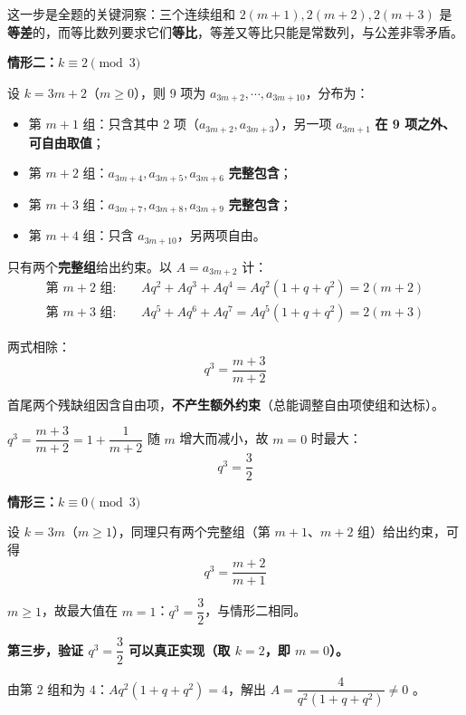 \begin{gktip}
这一步是全题的关键洞察：三个连续组和 $2(m+1),2(m+2),2(m+3)$ 是\textbf{等差}的，而等比数列要求它们\textbf{等比}，等差又等比只能是常数列，与公差非零矛盾。
\end{gktip}

\par\medskip

\textbf{情形二：$k\equiv2\pmod 3$}

设 $k=3m+2$（$m\ge0$），则 9 项为 $a_{3m+2},\cdots,a_{3m+10}$，分布为：
\begin{itemize}
\item 第 $m+1$ 组：只含其中 2 项（$a_{3m+2},a_{3m+3}$），另一项 $a_{3m+1}$ \textbf{在 9 项之外、可自由取值}；
\item 第 $m+2$ 组：$a_{3m+4},a_{3m+5},a_{3m+6}$ \textbf{完整包含}；
\item 第 $m+3$ 组：$a_{3m+7},a_{3m+8},a_{3m+9}$ \textbf{完整包含}；
\item 第 $m+4$ 组：只含 $a_{3m+10}$，另两项自由。
\end{itemize}

只有两个\textbf{完整组}给出约束。以 $A=a_{3m+2}$ 计：
\[\begin{aligned}
\text{第 }m+2\text{ 组}:&\quad Aq^2+Aq^3+Aq^4=Aq^2\left(1+q+q^2\right)=2(m+2)\\
\text{第 }m+3\text{ 组}:&\quad Aq^5+Aq^6+Aq^7=Aq^5\left(1+q+q^2\right)=2(m+3)
\end{aligned}\]

两式相除：
\[q^3=\frac{m+3}{m+2}\]

首尾两个残缺组因含自由项，\textbf{不产生额外约束}（总能调整自由项使组和达标）。

$q^3=\dfrac{m+3}{m+2}=1+\dfrac{1}{m+2}$ 随 $m$ 增大而减小，故 $m=0$ 时最大：
\[q^3=\frac32\]

\par\medskip

\textbf{情形三：$k\equiv0\pmod 3$}

设 $k=3m$（$m\ge1$），同理只有两个完整组（第 $m+1$、$m+2$ 组）给出约束，可得
\[q^3=\frac{m+2}{m+1}\]

$m\ge1$，故最大值在 $m=1$：$q^3=\dfrac32$，与情形二相同。

\par\medskip

\textbf{第三步，验证 $q^3=\dfrac32$ 可以真正实现（取 $k=2$，即 $m=0$）。}

由第 $2$ 组和为 $4$：$Aq^2\left(1+q+q^2\right)=4$，解出 $A=\dfrac{4}{q^2\left(1+q+q^2\right)}\ne0$ 。

